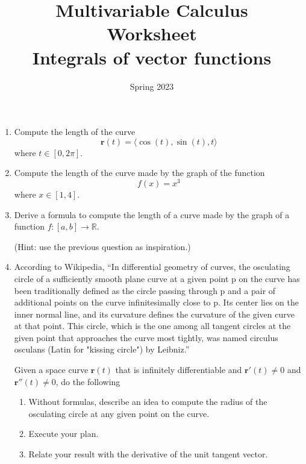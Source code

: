 \documentclass{amsart}
\title{ Multivariable Calculus \\ Worksheet \\ Integrals of vector functions}
\author{}
\date{Spring 2023}
\newcommand{\vect}{\mathbf}
\newcommand{\R}{\mathbb{R}}
\begin{document}
\maketitle
\begin{enumerate}
    \item Compute the length of the curve
        $$\vect{r}(t) =  \langle \cos(t) ,\sin(t), t \rangle$$
        where $t\in [0,2\pi]$.
    \item Compute the length of the curve made by the graph of the function
$$ f(x) = x^3 $$
where $x \in [1,4]$.
    \item Derive a formula to compute the length of a curve made by 
        the graph of a function
        $f:[a,b] \to \R$.

        (Hint: use the previous question as inspiration.)

    \item 
        According to Wikipedia,
        ``In differential geometry of curves, the osculating circle of a sufficiently smooth plane curve at a given point p on the curve has been traditionally defined as the circle passing through p and a pair of additional points on the curve infinitesimally close to p. Its center lies on the inner normal line, and its curvature defines the curvature of the given curve at that point. This circle, which is the one among all tangent circles at the given point that approaches the curve most tightly, was named circulus osculans (Latin for "kissing circle") by Leibniz.''

        Given a space curve $\vect{r}(t)$ that is infinitely differentiable and 
        $\vect{r}'(t)\not=0$ and $\vect{r}''(t)\not=0$,
        do the following
        \begin{enumerate}
            \item Without formulas, describe an idea to compute the radius of 
                the osculating circle at any given point on the curve.
            \item Execute your plan.
            \item Relate your result with the derivative of the unit tangent vector.
        \end{enumerate}
\end{enumerate}
\end{document}
